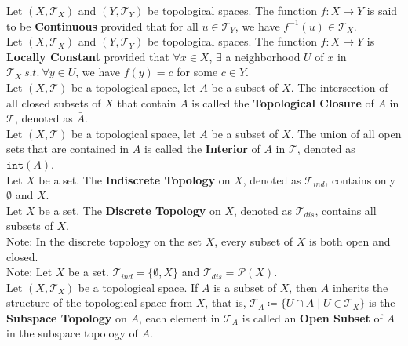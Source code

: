 \documentclass[11pt]{article}
\newcommand{\T}{\mathcal{T}}
\newcommand{\Power}{\mathcal{P}}
\newcommand{\note}{\color{gray}Note: \color{black}}
\begin{document}
		\noindent Let $(X,\T_X)$ and $(Y,\T_Y)$ be topological spaces. The function $f:X \to Y$ is said to be \textbf{Continuous} provided that for all $u \in \T_Y$, we have $f^{-1}(u) \in \T_X$.\\
		
		\noindent Let $(X,\T_X)$ and $(Y,\T_Y)$ be topological spaces. The function $f:X \to Y$ is \textbf{Locally Constant} provided that $\forall x \in X$, $\exists$ a neighborhood $U$ of $x$ in $\T_X \ s.t. \ \forall y \in U$, we have $f(y)=c$ for some $c \in Y$.\\
		
		\noindent Let $(X,\T)$ be a topological space, let $A$ be a subset of $X$. The intersection of all closed subsets of $X$ that contain $A$ is called the \textbf{Topological Closure} of $A$ in $\T$, denoted as $\bar{A}$.\\
		
		\noindent Let $(X,\T)$ be a topological space, let $A$ be a subset of $X$. The union of all open sets that are contained in $A$ is called the \textbf{Interior} of $A$ in $\T$, denoted as $\texttt{int}(A)$.\\ 
		
		\noindent Let $X$ be a set. The \textbf{Indiscrete Topology} on $X$, denoted as $\T_{ind}$, contains only $\emptyset$ and $X$.\\ Let $X$ be a set. The \textbf{Discrete Topology} on $X$, denoted as $\T_{dis}$, contains all subsets of $X$.\\
		\note In the discrete topology on the set $X$, every subset of $X$ is both open and closed.\\
		\note Let $X$ be a set. $\T_{ind} =\{\emptyset, X\}$ and $\T_{dis} = \Power (X)$.\\
		
		\noindent Let $(X,\T_X)$ be a topological space. If $A$ is a subset of $X$, then $A$ inherits the structure of the topological space from $X$, that is, $\T_A \coloneqq \{ U \cap A \mid U \in \T_X \}$ is the \textbf{Subspace Topology} on $A$, each element in $\T_A$ is called an \textbf{Open Subset} of $A$ in the subspace topology of $A$.\\
		
\end{document}
